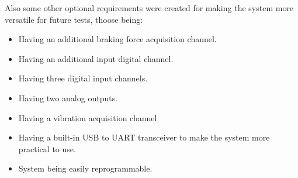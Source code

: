 	Also some other optional requirements were created for making the system more versatile for future tests, thoose being:

	\begin{itemize}
		\item Having an additional braking force acquisition channel.
		\item Having an additional input digital channel.
		\item Having three digital input channels.
		\item Having two analog outputs.
		\item Having a vibration acquisition channel
		\item Having a built-in USB to UART transceiver to make the system more practical to use.
		\item System being easily reprogrammable.
	\end{itemize}

\begin{comment}
\section{Software Requirements}\label{sec:software-requirements}
	
	\begin{enumerate}
		\item System must have a sampling rate of 50 ms.\label{itm:soft-req-1}
		\item System must be able to monitor six analog channels at once.\label{itm:soft-req-2}
		\item System must be able to control the digital outputs and one analog output during acquisition without loosing the real time constrain.\label{itm:soft-req-3}
		\item The data acquired does not need to be shown to user in real time.\label{itm:soft-req-4}
		\item The software layer must be able to record the data of the test.\label{itm:soft-req-5}
		\item The software highest layer must have a friendly GUI, advanced electronic and simple programmable knowledge cannot be a requirement to operate the software.\label{itm:soft-req-6}
		\item Calibration of the sensors data must be easy to modify on the software.\label{itm:soft-req-7}
		\item Software must be multiplatform.\label{itm:soft-req-8}
	\end{enumerate}
\end{comment}